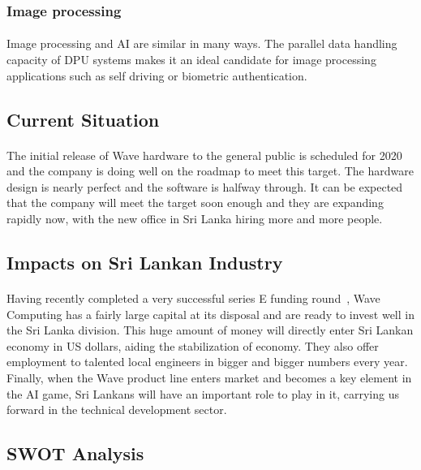 \subsubsection*{Image processing}
\paragraph{}
Image processing and AI are similar in many ways. The parallel data handling capacity of DPU systems makes it an ideal candidate for image processing applications such as self driving or biometric authentication.


\subsection{Current Situation}
\paragraph{}
The initial release of Wave hardware to the general public is scheduled for 2020 and the company is doing well on the roadmap to meet this target. The hardware design is nearly perfect and the software is halfway through. It can be expected that the company will meet the target soon enough and they are expanding rapidly now, with the new office in Sri Lanka hiring more and more people. 


\subsection{Impacts on Sri Lankan Industry}
\paragraph{}
Having recently completed a very successful series E funding round~\cite{fund}, Wave Computing has a fairly large capital at its disposal and are ready to invest well in the Sri Lanka division. This huge amount of money will directly enter Sri Lankan economy in US dollars, aiding the stabilization of economy. They also offer employment to talented local engineers in bigger and bigger numbers every year. Finally, when the Wave product line enters market and becomes a key element in the AI game, Sri Lankans will have an important role to play in it, carrying us forward in the technical development sector.

\newpage
\subsection{SWOT Analysis}

